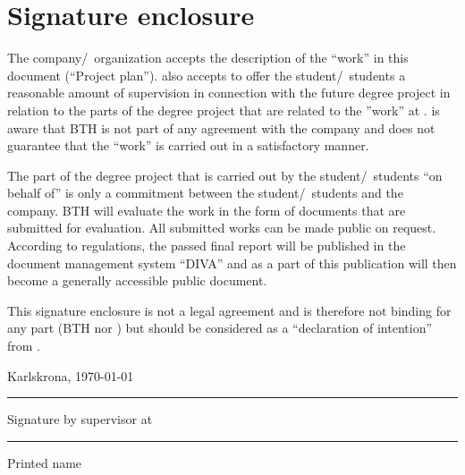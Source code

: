 \section{Signature enclosure}
The company/~organization \textit{\theCompany} accepts the description of the ``work'' in
this document (``Project plan'').
\textit{\theCompany} also accepts to offer
the student/~students a reasonable amount of supervision in connection with the future degree project in relation to the parts of the degree project that are related to the ”work” at \textit{\theCompany}.
\textit{\theCompany} is aware that BTH is not part of any agreement with the company and does not guarantee that the ``work'' is carried out in a satisfactory manner.

The part of the degree project that is carried out by the student/~students ``on behalf of''
\textit{\theCompany} is only a commitment between the student/~students and the company.
BTH will evaluate the work in the form of documents that are submitted for evaluation.
All submitted works can be made public on request. 
According to regulations, the passed final report will be published in the document management system ``DIVA'' and as a part of this publication will then become a generally accessible public document.

This signature enclosure is not a legal agreement and is therefore not binding for any part
(BTH nor \textit{\theCompany}) but should be considered as a ``declaration of intention''
from \textit{\theCompany}.

\vspace{12mm}
Karlskrona, \today
\vspace{12mm}

\rule{10cm}{1pt}

Signature by supervisor at \theCompany
\vspace{12mm}

\rule{10cm}{1pt}

Printed name
